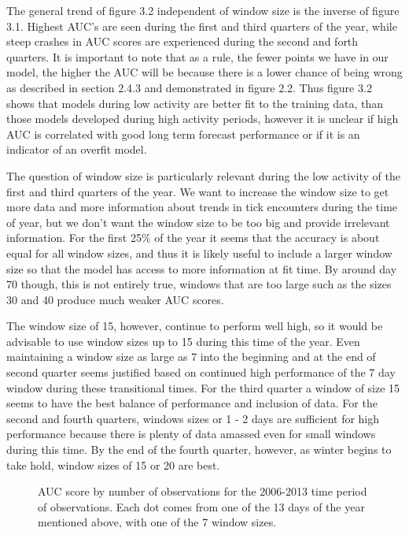 \noindent The general trend of figure 3.2 independent of window size is the inverse of figure 3.1. Highest AUC's are seen during the first and third quarters of the year, while steep crashes in AUC scores are experienced during the second and forth quarters. It is important to note that as a rule, the fewer points we have in our model, the higher the AUC will be because there is a lower chance of being wrong as described in section 2.4.3 and demonstrated in figure 2.2. Thus figure 3.2 shows that models during low activity are better fit to the training data, than those models developed during high activity periods, however it is unclear if high AUC is correlated with good long term forecast performance or if it is an indicator of an overfit model. \newline

\noindent The question of window size is particularly relevant during the low activity of the first and third quarters of the year. We want to increase the window size to get more data and more information about trends in tick encounters during the time of year, but we don't want the window size to be too big and provide irrelevant information. For the first 25\% of the year it seems that the accuracy is about equal for all window sizes, and thus it is likely useful to include a larger window size so that the model has access to more information at fit time. By around day 70 though, this is not entirely true, windows that are too large such as the sizes 30 and 40 produce much weaker AUC scores. \newline

\noindent The window size of 15, however, continue to perform well high, so it would be advisable to use window sizes up to 15 during this time of the year. Even maintaining a window size as large as 7 into the beginning and at the end of second quarter seems justified based on continued high performance of the 7 day window during these transitional times. For the third quarter a window of size 15 seems to have the best balance of performance and inclusion of data. For the second and fourth quarters, windows sizes or 1 - 2 days are sufficient for high performance because there is plenty of data amassed even for small windows during this time. By the end of the fourth quarter, however, as winter begins to take hold, window sizes of 15 or 20 are best. \newline

\begin{figure} [!ht]
\centerline{}
\caption{AUC score by number of observations for the 2006-2013 time period of observations. Each dot comes from one of the 13 days of the year mentioned above, with one of the 7 window sizes. }
\label{fig6}
\end{figure}

